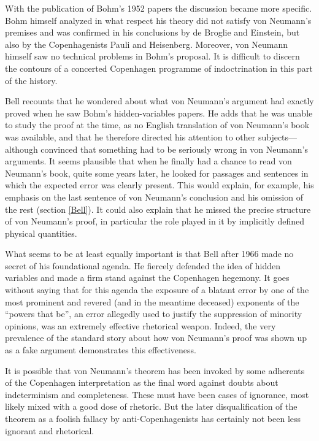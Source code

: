 \documentclass[12pt]{article}
\begin{document}
With the publication of Bohm's 1952 papers the discussion became more specific. Bohm himself analyzed in what respect his theory did not satisfy von Neumann's premises and was confirmed in his conclusions by de Broglie and Einstein, but also by the Copenhagenists Pauli and Heisenberg. Moreover, von Neumann himself saw no technical problems in Bohm's proposal. It is difficult to discern the contours of a concerted Copenhagen programme of indoctrination in this part of the history.

Bell recounts \cite{bell82} that he wondered about what von Neumann's argument had exactly proved when he saw Bohm's hidden-variables papers. He adds that he was unable to study the proof at the time, as no English translation of von Neumann's book was available, and that he therefore directed his attention to other subjects---although convinced that something had to be seriously wrong in von Neumann's arguments. It seems plausible that when he finally had a chance to read von Neumann's book, quite some years later, he looked for passages and sentences in which the expected error was clearly present. This would explain, for example, his emphasis on the last sentence of von Neumann's conclusion and his omission of the rest (section \ref{Bell}). It could also explain that he missed the precise structure of von Neumann's proof, in particular the role played in it by implicitly defined physical quantities.

What seems to be at least equally important is that Bell after 1966 made no secret of his foundational agenda. He fiercely defended the idea of hidden variables and made a firm stand against the Copenhagen hegemony. It goes without saying that for this agenda the exposure of a blatant error by one of the most prominent and revered (and in the meantime deceased) exponents of the ``powers that be'', an error allegedly used to justify the suppression of minority opinions, was an extremely effective rhetorical weapon. Indeed, the very prevalence of the standard story about how von Neumann's proof was shown up as a fake argument demonstrates this effectiveness.

It is possible that von Neumann's theorem has been invoked by some adherents of the Copenhagen interpretation as the final word against doubts about indeterminism and completeness. These must have been cases of ignorance, most likely mixed with a good dose of rhetoric. But the later disqualification of the theorem as a foolish fallacy by anti-Copenhagenists has certainly not been less ignorant and rhetorical.
\end{document}
